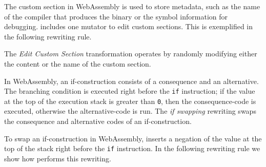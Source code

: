 The custom section in WebAssembly is used to store metadata, such as the name of the compiler that produces the binary or the symbol information for debugging.
\tool includes one mutator to edit custom sections. 
This is exemplified in the following rewriting rule. 



The \emph{Edit Custom Section} transformation operates by randomly modifying either the content or the name of the custom section. 




 In WebAssembly, an if-construction consists of a consequence and an alternative. The branching condition is executed right before the \texttt{if} instruction; if the value at the top of the execution stack is greater than \texttt{0}, then the consequence-code is executed, otherwise the alternative-code is run.
The \emph{if swapping} rewriting swaps the consequence and alternative codes of an if-construction.



To swap an if-construction in WebAssembly, \tool inserts a negation of the value at the top of the stack right before the \texttt{if} instruction.
In the following rewriting rule we show how \tool performs this rewriting.



